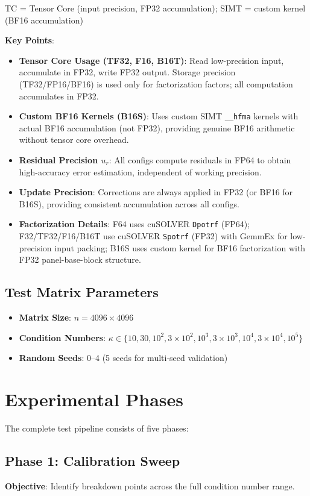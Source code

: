 \documentclass[11pt,a4paper]{article}
\begin{document}
\footnotesize TC = Tensor Core (input precision, FP32 accumulation); SIMT = custom kernel (BF16 accumulation)

\normalsize \textbf{Key Points}:
\begin{itemize}
  \item \textbf{Tensor Core Usage (TF32, F16, B16T)}: Read low-precision input, accumulate in FP32, write FP32 output. Storage precision (TF32/FP16/BF16) is used only for factorization factors; all computation accumulates in FP32.
  \item \textbf{Custom BF16 Kernels (B16S)}: Uses custom SIMT \texttt{\_\_hfma} kernels with actual BF16 accumulation (not FP32), providing genuine BF16 arithmetic without tensor core overhead.
  \item \textbf{Residual Precision $u_r$}: All configs compute residuals in FP64 to obtain high-accuracy error estimation, independent of working precision.
  \item \textbf{Update Precision}: Corrections are always applied in FP32 (or BF16 for B16S), providing consistent accumulation across all configs.
  \item \textbf{Factorization Details}: F64 uses cuSOLVER \texttt{Dpotrf} (FP64); F32/TF32/F16/B16T use cuSOLVER \texttt{Spotrf} (FP32) with GemmEx for low-precision input packing; B16S uses custom kernel for BF16 factorization with FP32 panel-base-block structure.
\end{itemize}

\subsection{Test Matrix Parameters}
\begin{itemize}
  \item \textbf{Matrix Size}: $n = 4096 \times 4096$
  \item \textbf{Condition Numbers}: $\kappa \in \{10, 30, 10^2, 3 \times 10^2, 10^3, 3 \times 10^3, 10^4, 3 \times 10^4, 10^5\}$
  \item \textbf{Random Seeds}: 0--4 (5 seeds for multi-seed validation)
\end{itemize}

\section{Experimental Phases}

The complete test pipeline consists of five phases:

\subsection{Phase 1: Calibration Sweep}
\textbf{Objective}: Identify breakdown points across the full condition number range.
\end{document}
